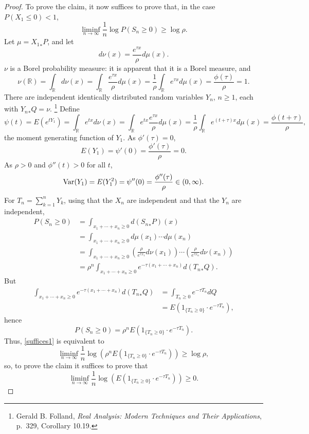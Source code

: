 \documentclass{article}
\newcommand{\Var}{\ensuremath\mathrm{Var}}
\theoremstyle{definition}
\begin{document}
\begin{proof}
To prove the claim, it now suffices to prove that, in the case $P(X_1 \leq 0)<1$, 
\begin{equation}
\liminf_{n \to \infty} \frac{1}{n} \log P(S_n \geq 0) \geq \log \rho.
\label{suffices1}
\end{equation}
Let $\mu = {X_1}_*P$, and 
let
\[
d\nu(x) = \frac{e^{\tau x}}{\rho} d\mu(x).
\]
$\nu$ is a Borel probability measure: it is apparent that it is a Borel measure, and
\[
\nu(\mathbb{R}) = \int_\mathbb{R} d\nu(x) = \int_\mathbb{R}  \frac{e^{\tau x}}{\rho} d\mu(x)
=\frac{1}{\rho} \int_\mathbb{R} e^{\tau x} d\mu(x)
=\frac{\phi(\tau)}{\rho} =1.
\]
There are independent identically distributed random variables $Y_n$, $n \geq 1$,
each with ${Y_n}_*Q = \nu$.
\footnote{Gerald B. Folland, {\em Real Analysis: Modern Techniques and
Their Applications}, p.~329, Corollary 10.19.}
Define
\[
\psi(t) = E(e^{tY_1}) = \int_\mathbb{R} e^{tx} d\nu(x)
=\int_\mathbb{R} e^{tx} \frac{e^{\tau x}}{\rho} d\mu(x)
=\frac{1}{\rho} \int_\mathbb{R} e^{(t+\tau)x} d\mu(x)
=\frac{\phi(t+\tau)}{\rho},
\]
the moment generating function of $Y_1$.
As $\phi'(\tau)=0$,
\[
E(Y_1) = \psi'(0) = \frac{\phi'(\tau)}{\rho} = 0.
\]
As $\rho>0$ and $\phi''(t)>0$ for all $t$,
\[
\Var(Y_1) = E(Y_1^2) = \psi''(0) = \frac{\phi''(\tau)}{\rho} \in (0,\infty).
\]
For $T_n=\sum_{k=1}^n Y_k$,
using that the $X_n$ are independent and that the $Y_n$ are independent,
\begin{align*}
P(S_n \geq 0) &= \int_{x_1 + \cdots +x_n \geq 0} d({S_n}_*P)(x)\\
&=\int_{x_1+\cdots+x_n \geq 0} d\mu(x_1) \cdots d\mu(x_n)\\
&=\int_{x_1+\cdots+x_n \geq 0} \left(\frac{\rho}{e^{\tau x_1}} d\nu(x_1) \right) 
\cdots \left( \frac{\rho}{e^{\tau x_n}} d\nu(x_n) \right)\\
&=\rho^n \int_{x_1+\cdots+x_n \geq 0} e^{-\tau(x_1+\cdots+x_n)} d({T_n}_*Q).
\end{align*}
But
\begin{align*}
\int_{x_1+\cdots+x_n \geq 0} e^{-\tau(x_1+\cdots+x_n)} d({T_n}_*Q)&= 
\int_{T_n \geq 0} e^{-\tau T_n} dQ\\
&=E(1_{\{T_n \geq 0\}} \cdot e^{-\tau T_n}),
\end{align*}
hence
\[
P(S_n \geq 0) = \rho^n E(1_{\{T_n \geq 0\}} \cdot e^{-\tau T_n}).
\]
Thus,   \eqref{suffices1} is equivalent to
\[
\liminf_{n \to \infty} \frac{1}{n} \log \left(  \rho^n E(1_{\{T_n \geq 0\}} \cdot e^{-\tau T_n}) \right) \geq \log \rho,
\]
so, to prove the claim it suffices to prove that
\[
\liminf_{n \to \infty} \frac{1}{n} \log\left( E(1_{\{T_n \geq 0\}} \cdot e^{-\tau T_n})\right) \geq 0.
\]
\end{proof}
\end{document}
